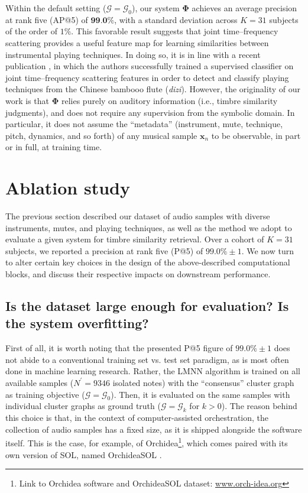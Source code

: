 \documentclass{bmcart}
\begin{document}
Within the default setting ($\mathcal{G}=\mathcal{G}_0$), our system $\mathbf{\Phi}$ achieves an average precision at rank five (AP@5) of $\textbf{99.0\%}$, with a standard deviation across $K=31$ subjects of the order of $1\%$.
This favorable result suggests that joint time--frequency scattering provides a useful feature map for learning similarities between instrumental playing techniques.
In doing so, it is in line with a recent publication \cite{wang2020icassp}, in which the authors successfully trained a supervised classifier on joint time--frequency scattering features in order to detect and classify playing techniques from the Chinese bambooo flute (\emph{dizi}).
However, the originality of our work is that $\mathbf{\Phi}$ relies purely on auditory information (i.e., timbre similarity judgments), and does not require any supervision from the symbolic domain.
In particular, it does not assume the ``metadata'' (instrument, mute, technique, pitch, dynamics, and so forth) of any musical sample $\boldsymbol{x}_n$ to be observable, in part or in full, at training time.



\section*{Ablation study}
The previous section described our dataset of audio samples with diverse instruments, mutes, and playing techniques, as well as the method we adopt to evaluate a given system for timbre similarity retrieval.
Over a cohort of $K=31$ subjects, we reported a precision at rank five (P@5) of $99.0\% \pm 1$.
We now turn to alter certain key choices in the design of the above-described computational blocks, and discuss their respective impacts on downstream performance.

\subsection*{Is the dataset large enough for evaluation? Is the system overfitting?}
First of all, it is worth noting that the presented P@5 figure of $99.0\% \pm 1$ does not abide to a conventional training set vs. test set paradigm, as is most often done in machine learning research.
Rather, the LMNN algorithm is trained on all available samples ($N^{\prime}=9346$ isolated notes) with the ``consensus'' cluster graph as training objective ($\mathcal{G}=\mathcal{G}_0$).
Then, it is evaluated on the same samples with individual cluster graphs as ground truth ($\mathcal{G}=\mathcal{G}_k$ for $k>0$).
The reason behind this choice is that, in the context of computer-assisted orchestration, the collection of audio samples has a fixed size, as it is shipped alongside the software itself.
This is the case, for example, of Orchidea\footnote{Link to Orchidea software and OrchideaSOL dataset: \url{www.orch-idea.org}}, which comes paired with its own version of SOL, named OrchideaSOL \cite{cella2020icmc}.
\end{document}

